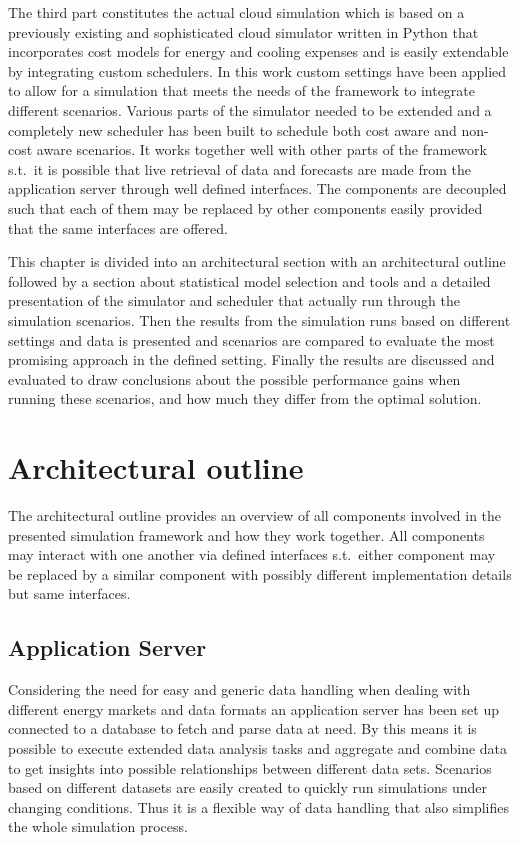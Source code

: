 The third part constitutes the actual cloud simulation which is based on a previously existing and sophisticated cloud simulator written in Python that incorporates cost models for energy and cooling expenses and is easily extendable by integrating custom schedulers. In this work custom settings have been applied to allow for a simulation that meets the needs of the framework to integrate different scenarios. Various parts of the simulator needed to be extended and a completely new scheduler has been built to schedule both cost aware and non-cost aware scenarios. It works together well with other parts of the framework s.t.~it is possible that live retrieval of data and forecasts are made from the application server through well defined interfaces. The components are decoupled such that each of them may be replaced by other components easily provided that the same interfaces are offered. 

This chapter is divided into an architectural section with an architectural outline followed by a section about statistical model selection and tools and a detailed presentation of the simulator and scheduler that actually run through the simulation scenarios. Then the results from the simulation runs based on different settings and data is presented and scenarios are compared to evaluate the most promising approach in the defined setting. Finally the results are discussed and evaluated to draw conclusions about the possible performance gains when running these scenarios, and how much they differ from the optimal solution. 


\section{Architectural outline}

The architectural outline provides an overview of all components involved in the presented simulation framework and how they work together. All components may interact with one another via defined interfaces s.t.~either component may be replaced by a similar component with possibly different implementation details but same interfaces. 

\subsection{Application Server}

Considering the need for easy and generic data handling when dealing with different energy markets and data formats an application server has been set up connected to a database to fetch and parse data at need. By this means it is possible to execute extended data analysis tasks and aggregate and combine data to get insights into possible relationships between different data sets. Scenarios based on different datasets are easily created to quickly run simulations under changing conditions. Thus it is a flexible way of data handling that also simplifies the whole simulation process. 

